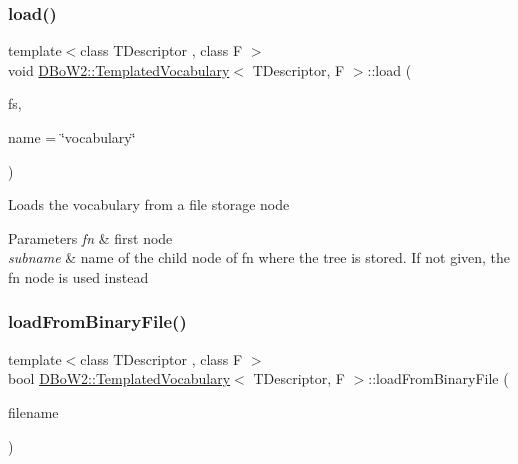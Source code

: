 \subsubsection{\texorpdfstring{load()}{load()}\hspace{0.1cm}{\footnotesize\ttfamily [2/2]}}
{\footnotesize\ttfamily template$<$class T\+Descriptor , class F $>$ \\
void \mbox{\hyperlink{class_d_bo_w2_1_1_templated_vocabulary}{D\+Bo\+W2\+::\+Templated\+Vocabulary}}$<$ T\+Descriptor, F $>$\+::load (\begin{DoxyParamCaption}\item[{const cv\+::\+File\+Storage \&}]{fs,  }\item[{const std\+::string \&}]{name = {\ttfamily \char`\"{}vocabulary\char`\"{}} }\end{DoxyParamCaption})\hspace{0.3cm}{\ttfamily [virtual]}}

Loads the vocabulary from a file storage node 
\begin{DoxyParams}{Parameters}
{\em fn} & first node \\
\hline
{\em subname} & name of the child node of fn where the tree is stored. If not given, the fn node is used instead \\
\hline
\end{DoxyParams}
\mbox{\label{class_d_bo_w2_1_1_templated_vocabulary_aa8c05732a3c2a063b0a8c1cbc418597a}} 
\subsubsection{\texorpdfstring{load\+From\+Binary\+File()}{loadFromBinaryFile()}}
{\footnotesize\ttfamily template$<$class T\+Descriptor , class F $>$ \\
bool \mbox{\hyperlink{class_d_bo_w2_1_1_templated_vocabulary}{D\+Bo\+W2\+::\+Templated\+Vocabulary}}$<$ T\+Descriptor, F $>$\+::load\+From\+Binary\+File (\begin{DoxyParamCaption}\item[{const std\+::string \&}]{filename }\end{DoxyParamCaption})}

